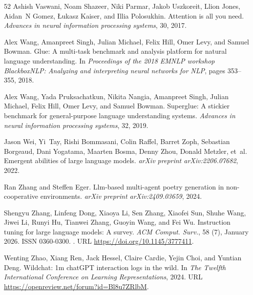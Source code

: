 \begin{thebibliography}{52}
Ashish Vaswani, Noam Shazeer, Niki Parmar, Jakob Uszkoreit, Llion Jones, Aidan~N Gomez, {\L}ukasz Kaiser, and Illia Polosukhin.
\newblock Attention is all you need.
\newblock \emph{Advances in neural information processing systems}, 30, 2017.

Alex Wang, Amanpreet Singh, Julian Michael, Felix Hill, Omer Levy, and Samuel Bowman.
\newblock Glue: A multi-task benchmark and analysis platform for natural language understanding.
\newblock In \emph{Proceedings of the 2018 EMNLP workshop BlackboxNLP: Analyzing and interpreting neural networks for NLP}, pages 353--355, 2018.

Alex Wang, Yada Pruksachatkun, Nikita Nangia, Amanpreet Singh, Julian Michael, Felix Hill, Omer Levy, and Samuel Bowman.
\newblock Superglue: A stickier benchmark for general-purpose language understanding systems.
\newblock \emph{Advances in neural information processing systems}, 32, 2019.

Jason Wei, Yi~Tay, Rishi Bommasani, Colin Raffel, Barret Zoph, Sebastian Borgeaud, Dani Yogatama, Maarten Bosma, Denny Zhou, Donald Metzler, et~al.
\newblock Emergent abilities of large language models.
\newblock \emph{arXiv preprint arXiv:2206.07682}, 2022.

Ran Zhang and Steffen Eger.
\newblock Llm-based multi-agent poetry generation in non-cooperative environments.
\newblock \emph{arXiv preprint arXiv:2409.03659}, 2024.

Shengyu Zhang, Linfeng Dong, Xiaoya Li, Sen Zhang, Xiaofei Sun, Shuhe Wang, Jiwei Li, Runyi Hu, Tianwei Zhang, Guoyin Wang, and Fei Wu.
\newblock Instruction tuning for large language models: A survey.
\newblock \emph{ACM Comput. Surv.}, 58 (7), January 2026.
\newblock ISSN 0360-0300.
\newblock {}.
\newblock URL \url{https://doi.org/10.1145/3777411}.

Wenting Zhao, Xiang Ren, Jack Hessel, Claire Cardie, Yejin Choi, and Yuntian Deng.
\newblock Wildchat: 1m chat{GPT} interaction logs in the wild.
\newblock In \emph{The Twelfth International Conference on Learning Representations}, 2024.
\newblock URL \url{https://openreview.net/forum?id=Bl8u7ZRlbM}.


\end{thebibliography}
